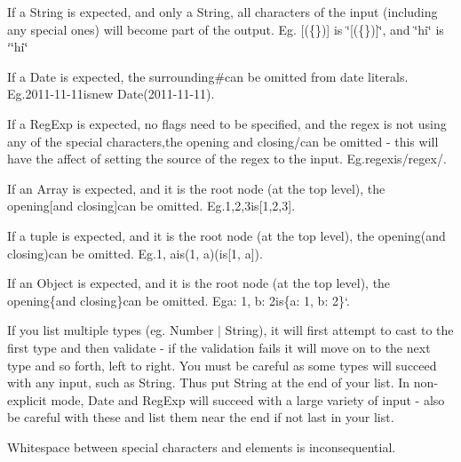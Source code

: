 \begin{DoxyItemize}
\item If a String is expected, and only a String, all characters of the input (including any special ones) will become part of the output. Eg. {\ttfamily \mbox{[}(\{\})\mbox{]}} is {\ttfamily \char`\"{}\mbox{[}(\{\})\mbox{]}\char`\"{}}, and {\ttfamily \char`\"{}hi\char`\"{}} is `\textquotesingle{}\char`\"{}hi\char`\"{}
\item {\ttfamily If a Date is expected, the surrounding}\#{\ttfamily can be omitted from date literals. Eg.}2011-\/11-\/11{\ttfamily is}new Date(\textquotesingle{}2011-\/11-\/11\textquotesingle{}){\ttfamily .}
\item {\ttfamily If a Reg\+Exp is expected, no flags need to be specified, and the regex is not using any of the special characters,the opening and closing}/{\ttfamily can be omitted -\/ this will have the affect of setting the source of the regex to the input. Eg.}regex{\ttfamily is}/regex/{\ttfamily .}
\item {\ttfamily If an Array is expected, and it is the root node (at the top level), the opening}\mbox{[}{\ttfamily and closing}\mbox{]}{\ttfamily can be omitted. Eg.}1,2,3{\ttfamily is}\mbox{[}1,2,3\mbox{]}{\ttfamily .}
\item {\ttfamily If a tuple is expected, and it is the root node (at the top level), the opening}({\ttfamily and closing}){\ttfamily can be omitted. Eg.}1, a{\ttfamily is}(1, a){\ttfamily (is}\mbox{[}1, \textquotesingle{}a\textquotesingle{}\mbox{]}{\ttfamily ).}
\item {\ttfamily If an Object is expected, and it is the root node (at the top level), the opening}\{{\ttfamily and closing}\}{\ttfamily can be omitted. Eg}a\+: 1, b\+: 2{\ttfamily is}\{a\+: 1, b\+: 2\}`.
\end{DoxyItemize}

If you list multiple types (eg. {\ttfamily Number $\vert$ String}), it will first attempt to cast to the first type and then validate -\/ if the validation fails it will move on to the next type and so forth, left to right. You must be careful as some types will succeed with any input, such as String. Thus put String at the end of your list. In non-\/explicit mode, Date and Reg\+Exp will succeed with a large variety of input -\/ also be careful with these and list them near the end if not last in your list.

Whitespace between special characters and elements is inconsequential.

